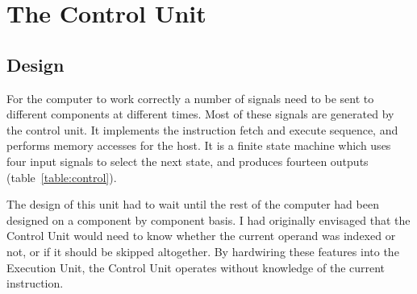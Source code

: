 \chapter{The Control Unit}

\section{Design}
For the computer to work correctly  a number of signals need to be sent to different components at different times.
 Most of these signals are generated by the control unit.
  It implements the instruction fetch and execute sequence, and performs memory accesses for the host.
  It is  a finite state machine 
which uses four input signals to select the next state, and produces fourteen outputs
 (table~\ref{table:control}).

The design of this unit had to wait until the rest of the computer had been designed on a component by component basis.
 I had originally envisaged that the Control Unit would need to know whether the current operand was indexed or not, or if it should be skipped altogether. 
 By  hardwiring these features into the Execution Unit, the Control Unit operates  without knowledge of the current instruction.

